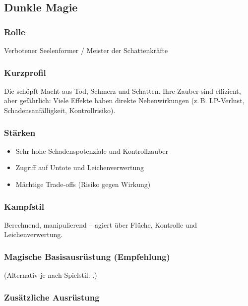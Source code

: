 \subsection{Dunkle Magie}

\subsubsection*{Rolle}
Verbotener Seelenformer / Meister der Schattenkräfte

\subsubsection*{Kurzprofil}
Die  schöpft Macht aus Tod, Schmerz und Schatten.
Ihre Zauber sind effizient, aber gefährlich: Viele Effekte haben direkte Nebenwirkungen
(z.\,B. LP-Verlust, Schadensanfälligkeit, Kontrollrisiko).

\subsubsection*{Stärken}
\begin{itemize}
	\item Sehr hohe Schadenspotenziale und Kontrollzauber
	\item Zugriff auf Untote und Leichenverwertung
	\item Mächtige Trade-offs (Risiko gegen Wirkung)
\end{itemize}

\subsubsection*{Kampfstil}
Berechnend, manipulierend – agiert über Flüche, Kontrolle und Leichenverwertung.

\subsubsection*{Magische Basisausrüstung (Empfehlung)}
 (Alternativ je nach Spielstil: .)

\subsubsection*{Zusätzliche Ausrüstung}

